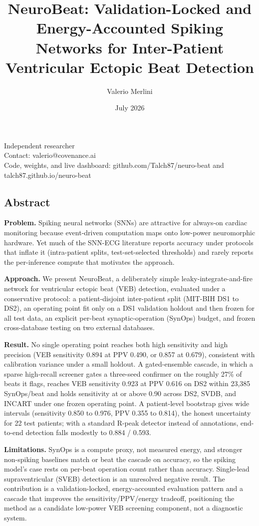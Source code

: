 \documentclass[
]{article}
\title{NeuroBeat: Validation-Locked and Energy-Accounted Spiking
Networks for Inter-Patient Ventricular Ectopic Beat Detection}
\author{Valerio Merlini}
\date{July 2026}
\begin{document}
\maketitle

Independent researcher\\
Contact: valerio@covenance.ai\\
Code, weights, and live dashboard: github.com/Talch87/neuro-beat and
talch87.github.io/neuro-beat

\subsection{Abstract}\label{abstract}

\textbf{Problem.} Spiking neural networks (SNNs) are attractive for
always-on cardiac monitoring because event-driven computation maps onto
low-power neuromorphic hardware. Yet much of the SNN-ECG literature
reports accuracy under protocols that inflate it (intra-patient splits,
test-set-selected thresholds) and rarely reports the per-inference
compute that motivates the approach.

\textbf{Approach.} We present NeuroBeat, a deliberately simple
leaky-integrate-and-fire network for ventricular ectopic beat (VEB)
detection, evaluated under a conservative protocol: a patient-disjoint
inter-patient split (MIT-BIH DS1 to DS2), an operating point fit only on
a DS1 validation holdout and then frozen for all test data, an explicit
per-beat synaptic-operation (SynOps) budget, and frozen cross-database
testing on two external databases.

\textbf{Result.} No single operating point reaches both high sensitivity
and high precision (VEB sensitivity 0.894 at PPV 0.490, or 0.857 at
0.679), consistent with calibration variance under a small holdout. A
gated-ensemble cascade, in which a sparse high-recall screener gates a
three-seed confirmer on the roughly 27\% of beats it flags, reaches VEB
sensitivity 0.923 at PPV 0.616 on DS2 within 23,385 SynOps/beat and
holds sensitivity at or above 0.90 across DS2, SVDB, and INCART under
one frozen operating point. A patient-level bootstrap gives wide
intervals (sensitivity 0.850 to 0.976, PPV 0.355 to 0.814), the honest
uncertainty for 22 test patients; with a standard R-peak detector
instead of annotations, end-to-end detection falls modestly to 0.884 /
0.593.

\textbf{Limitations.} SynOps is a compute proxy, not measured energy,
and stronger non-spiking baselines match or beat the cascade on
accuracy, so the spiking model's case rests on per-beat operation count
rather than accuracy. Single-lead supraventricular (SVEB) detection is
an unresolved negative result. The contribution is a validation-locked,
energy-accounted evaluation pattern and a cascade that improves the
sensitivity/PPV/energy tradeoff, positioning the method as a candidate
low-power VEB screening component, not a diagnostic system.
\end{document}
